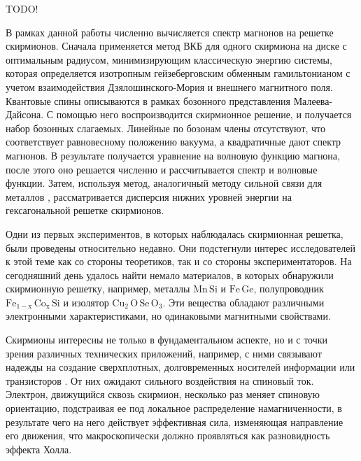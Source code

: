\documentclass[a4paper,article,14pt]{extarticle}
\begin{document}

TODO!

В рамках данной работы численно вычисляется спектр магнонов на решетке скирмионов. Сначала применяется метод ВКБ для одного скирмиона на диске с оптимальным радиусом, минимизирующим классическую энергию системы, которая определяется изотропным гейзеберговским обменным гамильтонианом с учетом взаимодействия Дзялошинского-Мория и внешнего магнитного поля. Квантовые спины описываются в рамках бозонного представления Малеева-Дайсона. С помощью него воспроизводится скирмионное решение, и получается набор бозонных слагаемых. Линейные по бозонам члены отсутствуют, что соответствует равновесному положению вакуума, а квадратичные дают спектр магнонов. В результате получается уравнение на волновую функцию магнона, после этого оно решается численно и рассчитывается спектр и волновые функции. Затем, используя метод, аналогичный методу сильной связи для металлов \cite{book:abrikosov}, рассматривается дисперсия нижних уровней энергии на гексагональной решетке скирмионов.


Одни из первых экспериментов, в которых наблюдалась скирмионная решетка, были проведены относительно недавно. \cite{paper:muhlbauer, paper:yu} Они подстегнули интерес исследователей к этой теме как со стороны теоретиков, так и со стороны экспериментаторов. На сегодняшний день удалось найти немало материалов, в которых обнаружили скирмионную решетку, например, металлы $\mathrm{Mn\,Si}$ и $\mathrm{Fe\,Ge}$, полупроводник $\mathrm{Fe_{1-x}\,Co_x\,Si}$ \cite{paper:munzer} и изолятор $\mathrm{Cu_2\,O\, Se\, O_3}$. Эти вещества обладают различными электронными характеристиками, но одинаковыми магнитными свойствами. \cite{paper:nagaosa}


Скирмионы интересны не только в фундаментальном аспекте, но и с точки зрения различных технических приложений, например, с ними связывают надежды на создание сверхплотных, долговременных носителей информации \cite{paper:kiselevBogdanov, paper:fert} или транзисторов \cite{paper:zhang}. От них ожидают сильного воздействия на спиновый ток. Электрон, движущийся сквозь скирмион, несколько раз меняет спиновую ориентацию, подстраивая ее под локальное распределение намагниченности, в результате чего на него действует эффективная сила, изменяющая направление его движения, что макроскопически должно проявляться как разновидность эффекта Холла.\cite{rosch_pfleiderer}
\end{document}
